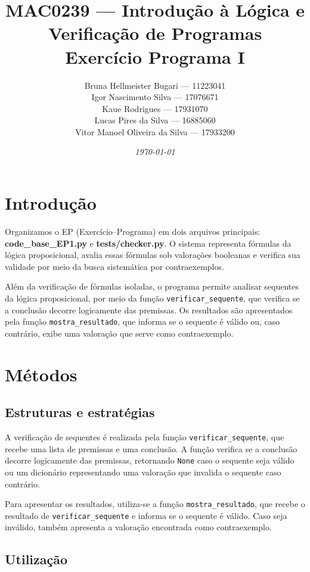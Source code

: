 \documentclass[a4paper]{article}
\title{MAC0239 --- Introdução à Lógica e Verificação de Programas\\
	Exercício Programa I}
\author{
    Bruna Hellmeister Bugari --- 11223041\\
    Igor Nascimento Silva --- 17076671\\
    Kaue Rodrigues --- 17931070\\
    Lucas Pires da Silva --- 16885060\\
    Vitor Manoel Oliveira da Silva --- 17933200\\
}
\date{\textit{\small{\today}}}
\begin{document}
\maketitle

\section{Introdução}

Organizamos o EP (Exercício--Programa) em dois arquivos principais:\\ \textbf{code\_base\_EP1.py} e \textbf{tests/checker.py}. O sistema representa fórmulas da lógica proposicional, avalia essas fórmulas sob valorações booleanas e verifica sua validade por meio da busca sistemática por contraexemplos.

Além da verificação de fórmulas isoladas, o programa permite analisar sequentes da lógica proposicional, por meio da função \texttt{verificar\_sequente}, que verifica se a conclusão decorre logicamente das premissas. Os resultados são apresentados pela função \texttt{mostra\_resultado}, que informa se o sequente é válido ou, caso contrário, exibe uma valoração que serve como contraexemplo.

\section{Métodos}

\subsection{Estruturas e estratégias}

A verificação de sequentes é realizada pela função \texttt{verificar\_sequente}, que recebe uma lista de premissas e uma conclusão. A função verifica se a conclusão decorre logicamente das premissas, retornando \texttt{None} caso o sequente seja válido ou um dicionário representando uma valoração que invalida o sequente caso contrário.

Para apresentar os resultados, utiliza-se a função \texttt{mostra\_resultado}, que recebe o resultado de \texttt{verificar\_sequente} e informa se o sequente é válido. Caso seja inválido, também apresenta a valoração encontrada como contraexemplo.

\subsection{Utilização}
\end{document}
